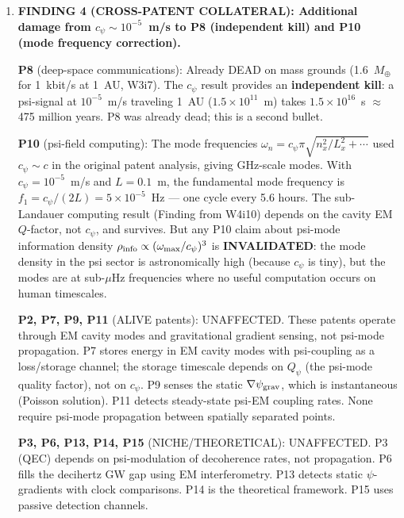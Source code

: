 \documentclass[11pt]{article}
\newcommand{\ee}[1]{\times 10^{#1}}
\newcommand{\Qpsi}{Q_\psi}
\begin{document}
\begin{tcolorbox}[colback=blue!5!white, colframe=blue!60!black,
  title=\textbf{W4i15 TOP 5 FINDINGS --- Ranked by Programme Impact}]
\begin{enumerate}
  \textbf{Key insight}: $c_\psi$ is universal across all Newtonian
  environments (Earth, neutron star, solar system) because $\mu_0 \to 1$
  in all of them. The speed is set entirely by cosmological parameters
  ($a_0$, $c$) and is independent of local gravitational strength.
  This is physically consistent: the temporal sector normalization
  $c/a_0$ is a cosmological ratio, not a local one.

\item \textbf{FINDING 4 (CROSS-PATENT COLLATERAL): Additional damage
  from $c_\psi \sim 10^{-5}$~m/s to P8 (independent kill) and P10
  (mode frequency correction).}

  \textbf{P8} (deep-space communications): Already DEAD on mass grounds
  (1.6~$M_\oplus$ for 1~kbit/s at 1~AU, W3i7). The $c_\psi$ result
  provides an \textbf{independent kill}: a psi-signal at $10^{-5}$~m/s
  traveling 1~AU ($1.5\ee{11}$~m) takes $1.5\ee{16}$~s $\approx$
  475 million years. P8 was already dead; this is a second bullet.

  \textbf{P10} (psi-field computing): The mode frequencies
  $\omega_n = c_\psi \pi\sqrt{n_x^2/L_x^2 + \cdots}$ used
  $c_\psi \sim c$ in the original patent analysis, giving GHz-scale
  modes. With $c_\psi = 10^{-5}$~m/s and $L = 0.1$~m, the fundamental
  mode frequency is $f_1 = c_\psi/(2L) = 5\ee{-5}$~Hz --- one cycle
  every 5.6 hours. The sub-Landauer computing result (Finding from W4i10)
  depends on the cavity EM $Q$-factor, not $c_\psi$, and survives.
  But any P10 claim about psi-mode information density
  $\rho_{\rm info} \propto (\omega_{\rm max}/c_\psi)^3$ is
  \textbf{INVALIDATED}: the mode density in the psi sector is
  astronomically high (because $c_\psi$ is tiny), but the modes
  are at sub-$\mu$Hz frequencies where no useful computation occurs
  on human timescales.

  \textbf{P2, P7, P9, P11} (ALIVE patents): UNAFFECTED. These patents
  operate through EM cavity modes and gravitational gradient sensing,
  not psi-mode propagation. P7 stores energy in EM cavity modes with
  psi-coupling as a loss/storage channel; the storage timescale depends
  on $\Qpsi$ (the psi-mode quality factor), not on $c_\psi$. P9
  senses the static $\nabla\psi_{\rm grav}$, which is instantaneous
  (Poisson solution). P11 detects steady-state psi-EM coupling rates.
  None require psi-mode propagation between spatially separated points.

  \textbf{P3, P6, P13, P14, P15} (NICHE/THEORETICAL): UNAFFECTED.
  P3 (QEC) depends on psi-modulation of decoherence rates, not
  propagation. P6 fills the decihertz GW gap using EM interferometry.
  P13 detects static $\psi$-gradients with clock comparisons.
  P14 is the theoretical framework. P15 uses passive detection channels.


\end{enumerate}
\end{tcolorbox}
\end{document}
